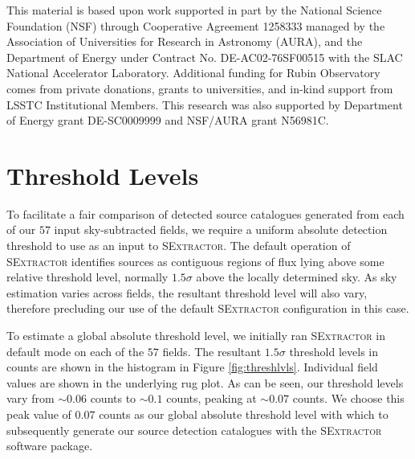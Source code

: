 \documentclass[fleqn,usenatbib,useAMS]{mnras}
\newcommand*{\about}{\mathord\sim}
\newcommand*{\SExtractor}{\textsc{SExtractor}\xspace}
\begin{document}
This material is based upon work supported in part by the National Science Foundation (NSF) through Cooperative Agreement 1258333 managed by the Association of Universities for Research in Astronomy (AURA), and the Department of Energy under Contract No. DE-AC02-76SF00515 with the SLAC National Accelerator Laboratory. Additional funding for Rubin Observatory comes from private donations, grants to universities, and in-kind support from LSSTC Institutional Members.
This research was also supported by Department of Energy grant DE-SC0009999 and NSF/AURA grant N56981C.








\appendix

\section{Threshold Levels}
\label{sec:thresholds}

To facilitate a fair comparison of detected source catalogues generated from each of our $57$ input sky-subtracted fields, we require a uniform absolute detection threshold to use as an input to \SExtractor. The default operation of \SExtractor identifies sources as contiguous regions of flux lying above some relative threshold level, normally $1.5\sigma$ above the locally determined sky. As sky estimation varies across fields, the resultant threshold level will also vary, therefore precluding our use of the default \SExtractor configuration in this case. 

To estimate a global absolute threshold level, we initially ran \SExtractor in default mode on each of the $57$ fields. The resultant $1.5\sigma$ threshold levels in counts are shown in the histogram in Figure \ref{fig:threshlvls}. Individual field values are shown in the underlying rug plot. As can be seen, our threshold levels vary from $\about0.06$ counts to $\about0.1$ counts, peaking at $\about0.07$ counts. We choose this peak value of $0.07$ counts as our global absolute threshold level with which to subsequently generate our source detection catalogues with the \SExtractor software package. 
\end{document}
